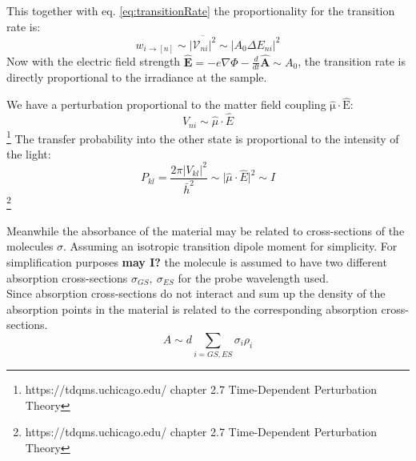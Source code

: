 \documentclass[twoside,openright]{scrreprt}
\begin{document}
{This together with eq. \ref{eq:transitionRate} the proportionality for the transition rate is:\cite[chapter 5.7-5.8]{Sakurai_Napolitano_2017}
\begin{equation}
w_{i\rightarrow [n]} \sim \overline{\lvert \mathcal{V}_{ni}\rvert^2} \sim \lvert A_0 \Delta E_{ni}\rvert^2
\end{equation}
Now with the electric field strength $\mathbf{\hat{E}} = -e\nabla\Phi - \frac{d}{dt} \mathbf{\hat{A}}\sim A_0$, the transition rate is directly proportional to the irradiance at the sample.

 
We have a perturbation proportional to the matter field coupling $\mathrm{\hat{\mu}\cdot \hat{E}}$:
\begin{equation}
V_{ni} \sim \hat{\mu}\cdot\hat{E}
\end{equation}\footnote{https://tdqms.uchicago.edu/ chapter 2.7 Time-Dependent Perturbation Theory}
The transfer probability into the other state is proportional to the intensity of the light:
\begin{equation*}
P_{kl} = \frac{2\pi \lvert V_{kl}\rvert^2}{\bar{h}^2} \sim \lvert \hat{\mu}\cdot\hat{E}\rvert^2 \sim I
\end{equation*}\footnote{https://tdqms.uchicago.edu/ chapter 2.7 Time-Dependent Perturbation Theory}

Meanwhile the absorbance of the material may be related to  cross-sections of the molecules $\sigma$. Assuming an isotropic transition dipole moment for simplicity. For simplification purposes \textbf{may I?} the molecule is assumed to have two different absorption cross-sections $\sigma_{GS},\ \sigma_{ES}$ for the probe wavelength used.\\
Since absorption cross-sections do not interact and sum up the density of the absorption points in the material is related to the corresponding absorption cross-sections.
\begin{equation}
A \sim d \sum_{i=GS, ES} \sigma_{i} \rho_i
\end{equation}

}
\end{document}
